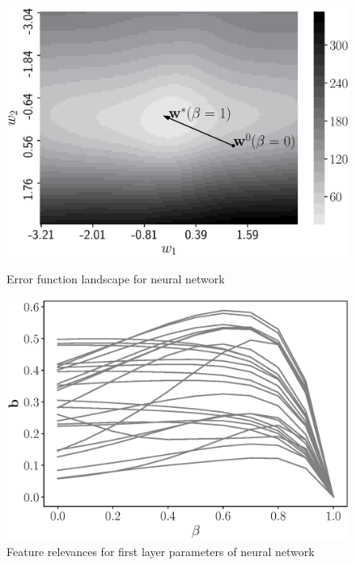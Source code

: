 \documentclass[
11pt,%
tightenlines,%
twoside,%
onecolumn,%
nofloats,%
nobibnotes,%
nofootinbib,%
superscriptaddress,%
noshowpacs,%
centertags]%
{revtex4}
\begin{document}
\begin{figure}
	\centering
	\begin{minipage}{.5\textwidth}
		\setcaptionmargin{5mm}
		\onelinecaptionsfalse %
		\centering
		\includegraphics[width=\linewidth]{figs/gray_neural_error.eps}
		\caption{Error function landscape for neural network}
		\label{fig:neural_error}
	\end{minipage}%
	\begin{minipage}{.5\textwidth}
		\setcaptionmargin{5mm}
		\onelinecaptionsfalse %
		\centering
		\includegraphics[width=\linewidth]{figs/gray_neural_b_wrt_beta.eps}
		\caption{Feature relevances for first layer parameters of neural network}
		\label{fig:neural_b_wrt_beta}
	\end{minipage}
\end{figure}
\end{document}

